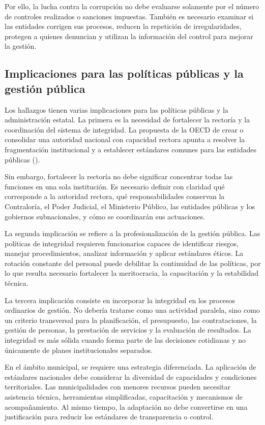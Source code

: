 \documentclass[Afour,sageh,times]{sagej}
\begin{document}
Por ello, la lucha contra la corrupción no debe evaluarse solamente por el número de controles realizados o sanciones impuestas. También es necesario examinar si las entidades corrigen sus procesos, reducen la repetición de irregularidades, protegen a quienes denuncian y utilizan la información del control para mejorar la gestión.

\subsection{Implicaciones para las políticas públicas y la gestión pública}
\label{subsec:implicaciones}

Los hallazgos tienen varias implicaciones para las políticas públicas y la administración estatal. La primera es la necesidad de fortalecer la rectoría y la coordinación del sistema de integridad. La propuesta de la OECD de crear o consolidar una autoridad nacional con capacidad rectora apunta a resolver la fragmentación institucional y a establecer estándares comunes para las entidades públicas (\citealp{oecd2024sistema}).

Sin embargo, fortalecer la rectoría no debe significar concentrar todas las funciones en una sola institución. Es necesario definir con claridad qué corresponde a la autoridad rectora, qué responsabilidades conservan la Contraloría, el Poder Judicial, el Ministerio Público, las entidades públicas y los gobiernos subnacionales, y cómo se coordinarán sus actuaciones.

La segunda implicación se refiere a la profesionalización de la gestión pública. Las políticas de integridad requieren funcionarios capaces de identificar riesgos, manejar procedimientos, analizar información y aplicar estándares éticos. La rotación constante del personal puede debilitar la continuidad de las políticas, por lo que resulta necesario fortalecer la meritocracia, la capacitación y la estabilidad técnica.

La tercera implicación consiste en incorporar la integridad en los procesos ordinarios de gestión. No debería tratarse como una actividad paralela, sino como un criterio transversal para la planificación, el presupuesto, las contrataciones, la gestión de personas, la prestación de servicios y la evaluación de resultados. La integridad es más sólida cuando forma parte de las decisiones cotidianas y no únicamente de planes institucionales separados.

En el ámbito municipal, se requiere una estrategia diferenciada. La aplicación de estándares nacionales debe considerar la diversidad de capacidades y condiciones territoriales. Las municipalidades con menores recursos pueden necesitar asistencia técnica, herramientas simplificadas, capacitación y mecanismos de acompañamiento. Al mismo tiempo, la adaptación no debe convertirse en una justificación para reducir los estándares de transparencia o control.
\end{document}
